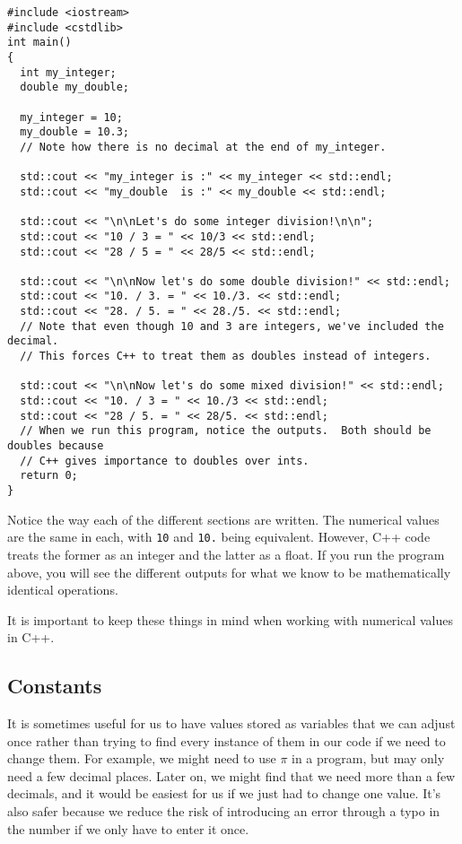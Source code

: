 \begin{verbatim}
#include <iostream>
#include <cstdlib>
int main()
{
  int my_integer;
  double my_double;

  my_integer = 10;
  my_double = 10.3;
  // Note how there is no decimal at the end of my_integer.

  std::cout << "my_integer is :" << my_integer << std::endl;
  std::cout << "my_double  is :" << my_double << std::endl;
  
  std::cout << "\n\nLet's do some integer division!\n\n";
  std::cout << "10 / 3 = " << 10/3 << std::endl;
  std::cout << "28 / 5 = " << 28/5 << std::endl;
  
  std::cout << "\n\nNow let's do some double division!" << std::endl;
  std::cout << "10. / 3. = " << 10./3. << std::endl;
  std::cout << "28. / 5. = " << 28./5. << std::endl;
  // Note that even though 10 and 3 are integers, we've included the decimal.  
  // This forces C++ to treat them as doubles instead of integers.
  
  std::cout << "\n\nNow let's do some mixed division!" << std::endl;
  std::cout << "10. / 3 = " << 10./3 << std::endl;
  std::cout << "28 / 5. = " << 28/5. << std::endl;
  // When we run this program, notice the outputs.  Both should be doubles because 
  // C++ gives importance to doubles over ints.
  return 0;
}
\end{verbatim}
Notice the way each of the different sections are written.  The numerical values are the same in each, with \texttt{10} and \texttt{10.} being equivalent.  However, C++ code treats the former as an integer and the latter as a float.  If you run the program above, you will see the different outputs for what we know to be mathematically identical operations.

It is important to keep these things in mind when working with numerical values in C++.

\subsection{Constants}
It is sometimes useful for us to have values stored as variables that we can adjust once rather than trying to find every instance of them in our code if we need to change them.  For example, we might need to use $\pi$ in a program, but may only need a few decimal places.  Later on, we might find that we need more than a few decimals, and it would be easiest for us if we just had to change one value.  It's also safer because we reduce the risk of introducing an error through a typo in the number if we only have to enter it once.

